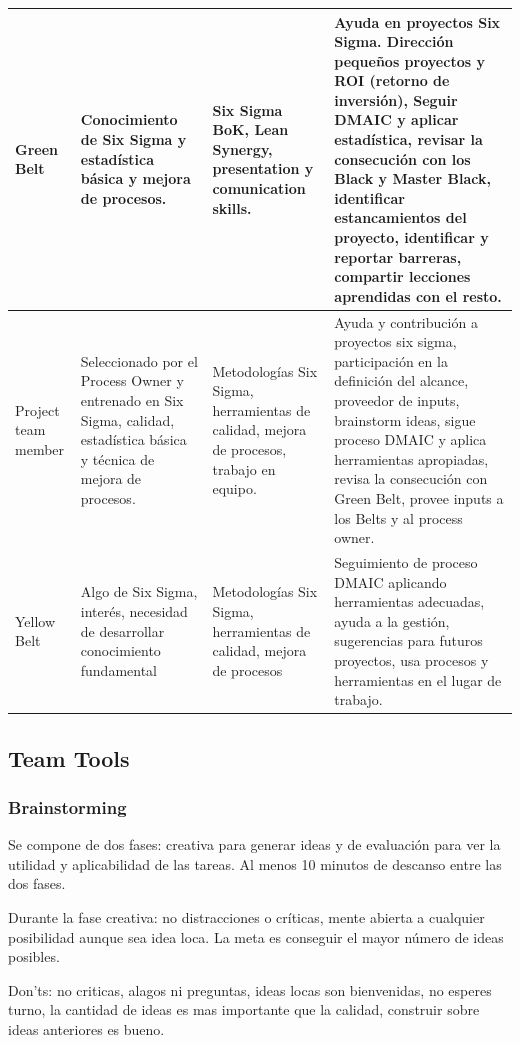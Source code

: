 \documentclass[]{article}
\begin{document}
\begin{tabular}{p{1.5cm}|p{3cm}|p{4cm}|p{7cm}}
	\hline Green Belt& Conocimiento de Six Sigma y estadística básica y mejora de procesos. & Six Sigma BoK, Lean Synergy, presentation y comunication skills. & Ayuda en proyectos Six Sigma. Dirección pequeños proyectos y ROI (retorno de inversión), Seguir DMAIC y aplicar estadística, revisar la consecución con los Black y Master Black, identificar estancamientos del proyecto, identificar y reportar barreras, compartir lecciones aprendidas con el resto. \\
	\hline Project team member & Seleccionado por el Process Owner y entrenado en Six Sigma, calidad, estadística básica y técnica de mejora de procesos. & Metodologías Six Sigma, herramientas de calidad, mejora de procesos, trabajo en equipo. & Ayuda y contribución a proyectos six sigma, participación en la definición del alcance, proveedor de inputs, brainstorm ideas, sigue proceso DMAIC y aplica herramientas apropiadas, revisa la consecución con Green Belt, provee inputs a los Belts y al process owner. \\
	\hline Yellow Belt & Algo de Six Sigma, interés, necesidad de desarrollar conocimiento fundamental & Metodologías Six Sigma, herramientas de calidad, mejora de procesos & Seguimiento de proceso DMAIC aplicando herramientas adecuadas, ayuda a la gestión, sugerencias para futuros proyectos, usa procesos y herramientas en el lugar de trabajo. \\
	\hline 
\end{tabular} 

\subsection{Team Tools}

\subsubsection{Brainstorming}
Se compone de dos fases: creativa para generar ideas y de evaluación para ver la utilidad y aplicabilidad de las tareas. Al menos 10 minutos de descanso entre las dos fases.

Durante la fase creativa: no distracciones o críticas, mente abierta a cualquier posibilidad aunque sea idea loca. La meta es conseguir el mayor número de ideas posibles.

Don'ts: no criticas, alagos ni preguntas, ideas locas son bienvenidas, no esperes turno, la cantidad de ideas es mas importante que la calidad, construir sobre ideas anteriores es bueno.
\end{document}

